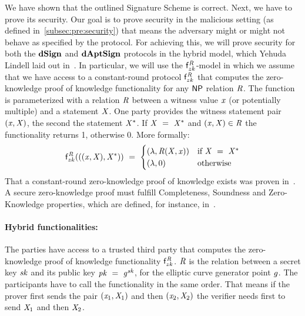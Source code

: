 We have shown that the outlined Signature Scheme is correct.
Next, we have to prove its security.
Our goal is to prove security in the malicious setting (as defined in~\cref{subsec:pre:security}) that means the adversary might or might not behave as specified by the protocol.
For achieving this, we will prove security for both the $\mathbf{dSign}$ and $\mathbf{dAptSign}$ protocols in the hybrid model, which Yehuda Lindell laid out in~\cite{lindell2017simulate}.
In particular, we will use the $\mathsf{f}^{\mathit{R}}_{zk}$-model in which we assume that we have access to a constant-round protocol $\mathsf{f}^{\mathit{R}}_{zk}$ that computes the zero-knowledge proof of knowledge functionality for any $\mathsf{NP}$ relation $\mathit{R}$.
The function is parameterized with a relation $\mathit{R}$ between a witness value $\mathit{x}$ (or potentially multiple)  and a statement $\mathit{X}$.
One party provides the witness statement pair $(\mathit{x}, \mathit{X})$, the second the statement $\mathit{X}^*$.
If $\mathit{X} ~=~ \mathit{X}^*$ and $(\mathit{x}, \mathit{X}) \in \mathit{R}$ the functionality returns 1, otherwise 0.
More formally:
\[
    \mathsf{f}^{\mathit{R}}_{zk}(((\mathit{x}, \mathit{X}), \mathit{X}^*)) ~=~
    \begin{cases}
        (\lambda, \mathit{R}(\mathit{X}, \mathit{x})) & \text{if } \mathit{X} ~=~ \mathit{X}^* \\
        (\lambda, 0) &\text{otherwise}
    \end{cases}
\]
That a constant-round zero-knowledge proof of knowledge exists was proven in~\cite{lindell2013note}.
A secure zero-knowledge proof must fulfill Completeness, Soundness and Zero-Knowledge properties, which are defined, for instance, in~\cite{groth2010short}.

\paragraph{Hybrid functionalities:} The parties have access to a trusted third party that computes the zero-knowledge proof of knowledge functionality $\mathsf{f}^{\mathit{R}}_{zk}$.
$\mathit{R}$ is the relation between a secret key $\mathit{sk}$ and its public key $\mathit{pk} ~=~ \mathit{g}^{\mathit{sk}}$, for the elliptic curve generator point $\mathit{g}$.
The participants have to call the functionality in the same order.
That means if the prover first sends the pair $(\mathit{x}_1, \mathit{X}_1)$ and then $(\mathit{x}_2, \mathit{X}_2)$ the verifier needs first to send $\mathit{X}_1$ and then $\mathit{X}_2$.


